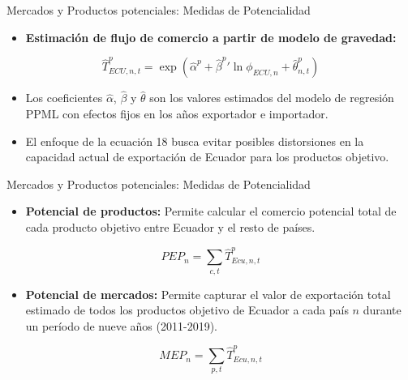 \documentclass{beamer}
\begin{document}
\begin{frame}{Mercados y Productos potenciales: Medidas de Potencialidad}
    \begin{itemize}
        \item \textbf{Estimación de flujo de comercio a partir de modelo de gravedad:}
    \end{itemize}
    \begin{equation} \tag{18}
    \hat{T}^{p}_{ECU,n,t} = \exp(\hat{\alpha}^{p} + \hat{\beta}^{p}'\ln \phi_{ECU,n} + \hat{\theta}^{p}_{n,t})
    \end{equation}
    \begin{itemize}
        \item Los coeficientes \( \hat{\alpha} \), \( \hat{\beta} \) y \( \hat{\theta} \) son los valores estimados del modelo de regresión PPML con efectos fijos en los años exportador e importador.
        \item El enfoque de la ecuación 18 busca evitar posibles distorsiones en la capacidad actual de exportación de Ecuador para los productos objetivo.
    \end{itemize}
\end{frame}

\begin{frame}{Mercados y Productos potenciales: Medidas de Potencialidad}
    \begin{itemize}
        \item \textbf{Potencial de productos:} Permite calcular el comercio potencial total de cada producto objetivo entre Ecuador y el resto de países.
    \end{itemize}
    \vspace{0.2cm}
    \begin{equation}
    PEP_{n} = \sum_{c,t} \hat{T}^p_{Ecu, n, t}
    \end{equation}

    \vspace{0.5cm}

    \begin{itemize}
        \item \textbf{Potencial de mercados:} Permite capturar el valor de exportación total estimado de todos los productos objetivo de Ecuador a cada país \( n \) durante un período de nueve años (2011-2019).
    \end{itemize}
    \vspace{0.2cm}
    \begin{equation}
    MEP_{n} = \sum_{p,t} \hat{T}^p_{Ecu, n, t}
    \end{equation}
\end{frame}
\end{document}
